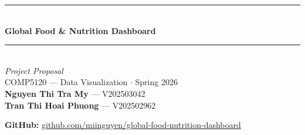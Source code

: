 \documentclass[aspectratio=169, 10pt]{beamer}
\begin{document}
\begin{frame}[plain]
\vfill
\begin{center}
  {\color{NDarkGreen}\rule{0.5\textwidth}{1pt}}\\[5pt]
  {\LARGE\bfseries\textcolor{NDarkGreen}{Global Food \& Nutrition Dashboard}}\\[5pt]
  {\color{NDarkGreen}\rule{0.5\textwidth}{1pt}}\\[8pt]
  {\normalsize\textit{Project Proposal}}\\[4pt]
  {\normalsize COMP5120 --- Data Visualization $\cdot$ Spring 2026}\\[8pt]
  {\small
    \textbf{Nguyen Thi Tra My} --- V202503042\\[1pt]
    \textbf{Tran Thi Hoai Phuong} --- V202502962}\\[10pt]
  \begin{tcolorbox}[dbox, width=0.55\textwidth, halign=center]
    \footnotesize \textbf{GitHub:}
    \href{https://github.com/miinguyen/global-food-nutrition-dashboard}%
         {github.com/miinguyen/global-food-nutrition-dashboard}
  \end{tcolorbox}
\end{center}
\vfill
\end{frame}
\end{document}
